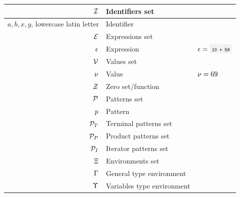 \begin{table}[!ht]
{\begin{tabular}{rll}
			$\mathcal{I}$                                                 & Identifiers set                  &                                           \\\hline
			$a,b,x,y$, lowercase latin letter                     & Identifier                       &                                           \\\hline
			$\mathcal{E}$                                               & Expressions set                  &                                           \\\hline
			$\epsilon$                                               & Expression                       & $\expr=\code{10 + 59}$                    \\\hline
			$\mathcal{V}$                                                & Values set                       &                                           \\\hline
			$\nu$                                                & Value                            & $\nu=69$                                 \\\hline
			$\mathcal{Z}$                                               & Zero set/function                &                                           \\\hline
			$\mathcal{P}$                                            & Patterns set                     &                                           \\\hline
			$p$                                            & Pattern                          &                                           \\\hline
			$\mathcal{P}_T$                                    & Terminal patterns set            &                                           \\\hline
			$\mathcal{P}_P$                                     & Product patterns set             &                                           \\\hline
			$\mathcal{P}_I$                                    & Iterator patterns set            &                                           \\\hline
			$\Xi$                                                & Environments set                 &                                           \\\hline
			$\Gamma$                                             & General type environment         &                                           \\\hline
			$\Upsilon$                                             & Variables type environment       &                                           \\\hline

\end{tabular}}
\end{table}
